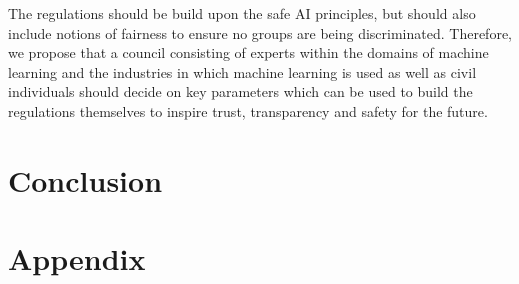 \documentclass[12pt, fleqn, titlepage]{article}
\newcommand\pythonstyle{\lstset{
		language=Python,
		tabsize=2,
		basicstyle=\ttm,
		morekeywords={self},              %
		keywordstyle=\ttb\color{deepblue},
		emph={MyClass,__init__},          %
		emphstyle=\ttb\color{deepred},    %
		stringstyle=\color{deepgreen},
		frame=tb,                         %
		showstringspaces=false,
		literate={\ \ }{{\ }}1
}}
\newcommand\pythonexternal[2][]{{
\pythonstyle
}}
\begin{document}
The regulations should be build upon the safe AI principles, but should also include notions of fairness to ensure no groups are being discriminated. Therefore, we propose that a council consisting of experts within the domains of machine learning and the industries in which machine learning is used as well as civil individuals should decide on key parameters which can be used to build the regulations themselves to inspire trust, transparency and safety for the future. 


\section{Conclusion}\label{conclusion}



\newpage
\section{Appendix}\label{appendix}
%
%
%
%
%
\end{document}
